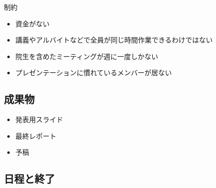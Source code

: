 \documentclass[11pt,a4paper]{jsarticle}
\begin{document}
制約
\begin{itemize}
\item 資金がない
\item 講義やアルバイトなどで全員が同じ時間作業できるわけではない
\item 院生を含めたミーティングが週に一度しかない
\item プレゼンテーションに慣れているメンバーが居ない
\end{itemize}

\subsection{成果物}
\begin{itemize}
\item 発表用スライド
\item 最終レポート
\item 予稿
\end{itemize}

\subsection{日程と終了}
\end{document}
